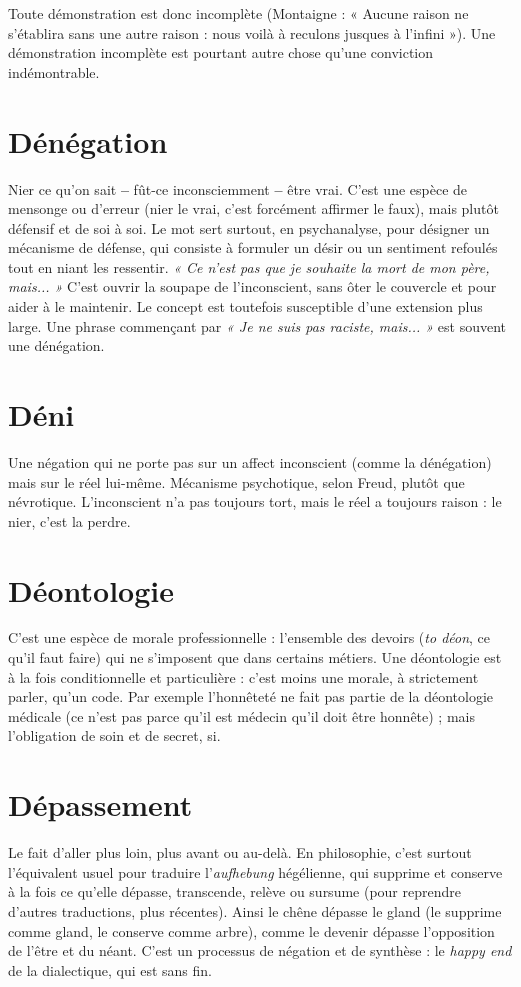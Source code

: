 Toute démonstration est donc incomplète (Montaigne : « Aucune raison
ne s’établira sans une autre raison : nous voilà à reculons jusques à l’infini »).
Une démonstration incomplète est pourtant autre chose qu’une conviction
indémontrable.

\section{Dénégation}
Nier ce qu’on sait {\bf --} fût-ce inconsciemment {\bf --} être vrai.
C’est une espèce de mensonge ou d’erreur (nier le vrai,
c’est forcément affirmer le faux), mais plutôt défensif et de soi à soi. Le mot sert
surtout, en psychanalyse, pour désigner un mécanisme de défense, qui consiste
à formuler un désir ou un sentiment refoulés tout en niant les ressentir. {\it « Ce
n'est pas que je souhaite la mort de mon père, mais... »} C’est ouvrir la soupape de
l'inconscient, sans ôter le couvercle et pour aider à le maintenir. Le concept est
toutefois susceptible d’une extension plus large. Une phrase commençant par
{\it « Je ne suis pas raciste, mais... »} est souvent une dénégation.

\section{Déni}
Une négation qui ne porte pas sur un affect inconscient (comme la
dénégation) mais sur le réel lui-même. Mécanisme psychotique,
selon Freud, plutôt que névrotique. L’inconscient n’a pas toujours tort, mais le
réel a toujours raison : le nier, c’est la perdre.

\section{Déontologie}
C’est une espèce de morale professionnelle : l’ensemble
des devoirs ({\it to déon}, ce qu’il faut faire) qui ne s'imposent
que dans certains métiers. Une déontologie est à la fois conditionnelle et
particulière : c’est moins une morale, à strictement parler, qu’un code. Par
exemple l'honnêteté ne fait pas partie de la déontologie médicale (ce n’est pas
parce qu’il est médecin qu’il doit être honnête) ; mais l’obligation de soin et de
secret, si.

\section{Dépassement}
Le fait d’aller plus loin, plus avant ou au-delà. En philosophie,
c’est surtout l'équivalent usuel pour traduire
l'{\it aufhebung} hégélienne, qui supprime et conserve à la fois ce qu’elle dépasse,
transcende, relève ou sursume (pour reprendre d’autres traductions, plus
récentes). Ainsi le chêne dépasse le gland (le supprime comme gland, le
conserve comme arbre), comme le devenir dépasse l’opposition de l'être et du
néant. C’est un processus de négation et de synthèse : le {\it happy end} de la dialectique,
qui est sans fin.


